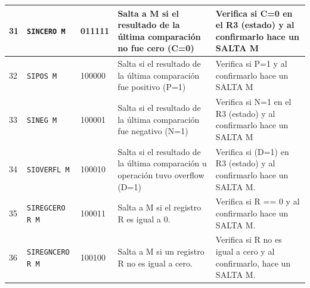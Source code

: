\documentclass{article}
\begin{document}
\begin{longtable}{|p{}|p{}|p{}|p{}|p{}|}
  \hline
  31                 & \texttt{SINCERO M}                               & 011111                          & Salta a M si el resultado de la última comparación no fue cero (C=0)                                                                                                                                                          & Verifica si C=0 en el R3 (estado) y al confirmarlo hace un SALTA M                                                     \\
  \hline
  32                 & \texttt{SIPOS M}                                 & 100000                          & Salta si el resultado de la última comparación fue positivo (P=1)                                                                                                                                                             & Verifica si P=1 y al confirmarlo hace un SALTA M                                                                       \\
  \hline
  33                 & \texttt{SINEG M}                                 & 100001                          & Salta si el resultado de la última comparación fue negativo (N=1)                                                                                                                                                             & Verifica si N=1 en el R3 (estado) y al confirmarlo hace un SALTA M                                                     \\
  \hline
  34                 & \texttt{SIOVERFL M}                              & 100010                          & Salta si el resultado de la última comparación u operación tuvo overflow (D=1)                                                                                                                                                & Verifica si (D=1) en R3 (estado) y al confirmarlo hace un SALTA M.                                                     \\
  \hline
  35                 & \texttt{SIREGCERO R M}                           & 100011                          & Salta a M si el registro R es igual a 0.                                                                                                                                                                                      & Verifica si R == 0 y al confirmarlo hace un SALTA M.                                                                   \\
  \hline
  36                 & \texttt{SIREGNCERO R M}                          & 100100                          & Salta a M si un registro R no es igual a cero.                                                                                                                                                                                & Verifica si R no es igual a cero y al confirmarlo, hace un SALTA M.                                                    \\

\end{longtable}
\end{document}
